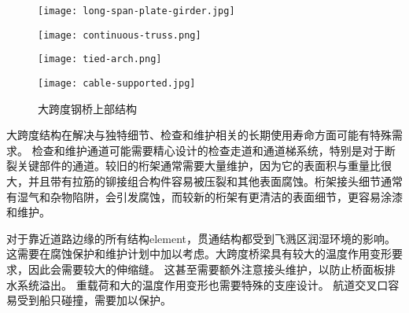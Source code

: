 \begin{figure}
  \begin{minipage}{0.48\linewidth}\centering
    \texttt{[image: long-span-plate-girder.jpg]}
  \end{minipage}\hfill
  \begin{minipage}{0.48\linewidth}\centering
    \texttt{[image: continuous-truss.png]}
  \end{minipage}
  \begin{minipage}{0.46\linewidth}\centering
    \texttt{[image: tied-arch.png]}
  \end{minipage}\hfill
  \begin{minipage}{0.52\linewidth}\centering
    \texttt{[image: cable-supported.jpg]}
  \end{minipage}
  \caption{大跨度钢桥上部结构}
  \label{fig:long-span-steel-bridge-superstructures}
\end{figure}

大跨度结构在解决与独特细节、检查和维护相关的长期使用寿命方面可能有特殊需求。 检查和维护通道可能需要精心设计的检查走道和通道梯系统，特别是对于断裂关键部件的通道。较旧的桁架通常需要大量维护，因为它的表面积与重量比很大，并且带有拉筋的铆接组合构件容易被压裂和其他表面腐蚀。桁架接头细节通常有湿气和杂物陷阱，会引发腐蚀，而较新的桁架有更清洁的表面细节，更容易涂漆和维护。

对于靠近道路边缘的所有结构\gls*{element}，贯通结构都受到飞溅区润湿环境的影响。这需要在腐蚀保护和维护计划中加以考虑。大跨度桥梁具有较大的温度作用变形要求，因此会需要较大的伸缩缝。 这甚至需要额外注意接头维护，以防止桥面板排水系统溢出。 重载荷和大的温度作用变形也需要特殊的支座设计。 航道交叉口容易受到船只碰撞，需要加以保护。

